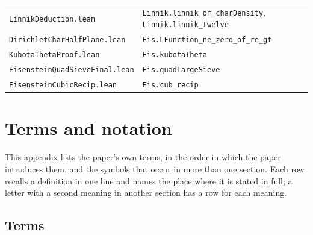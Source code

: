 \documentclass[11pt]{article}
\theoremstyle{definition}
\newcommand{\lean}[1]{\texttt{#1}}
\newcommand{\file}[1]{\nolinkurl{#1}}
\begin{document}
{\begin{longtable}{@{}l>{\raggedright\arraybackslash}p{}@{}}
\file{LinnikDeduction.lean} & \lean{Linnik.linnik\_of\_charDensity}, \lean{Linnik.linnik\_twelve} \\
\file{DirichletCharHalfPlane.lean} & \lean{Eis.LFunction\_ne\_zero\_of\_re\_gt} \\
\file{KubotaThetaProof.lean} & \lean{Eis.kubotaTheta} \\
\file{EisensteinQuadSieveFinal.lean} & \lean{Eis.quadLargeSieve} \\
\file{EisensteinCubicRecip.lean} & \lean{Eis.cub\_recip} \\
\bottomrule
\end{longtable}
}

\section{Terms and notation}\label{app:terms}

This appendix lists the paper's own terms, in the order in which the paper introduces them, and the symbols that
occur in more than one section. Each row recalls a definition in one line and names the place where it is stated in
full; a letter with a second meaning in another section has a row for each meaning.

\subsection*{Terms}
\end{document}
